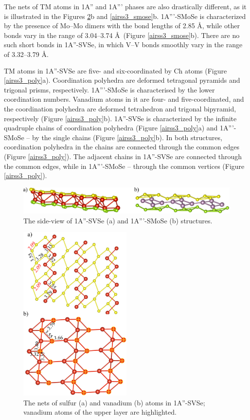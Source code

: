 \documentclass[a4paperm]{article}
\begin{document}
The nets of TM atoms in 1A'' and 1A''' phases are also drastically different, as it is illustrated in the Figures \ref{airss3_svse}b and \ref{airss3_smose}b.
1A'''-SMoSe is characterized by the presence of Mo--Mo dimers with the bond lengths of 2.85 \AA, while other bonds vary in the range of 3.04--3.74 \AA\ (Figure \ref{airss3_smose}b).
There are no such short bonds in 1A''-SVSe, in which V--V bonds smoothly vary in the range of 3.32--3.79 \AA.

TM atoms in 1A''-SVSe are five- and six-coordinated by Ch atoms (Figure \ref{airss3_poly}a).
Coordination polyhedra are deformed tetragonal pyramids and trigonal prisms, respectively.
1A'''-SMoSe is characterised by the lower coordination numbers.
Vanadium atoms in it are four- and five-coordinated, and the coordination polyhedra are deformed tetrahedron and trigonal bipyramid, respectively (Figure \ref{airss3_poly}b).
1A''-SVSe is characterized by the infinite quadruple chains of coordination polyhedra (Figure \ref{airss3_poly}a) and 1A'''-SMoSe -- by the single chains (Figure \ref{airss3_poly}b).
In both structures, coordination polyhedra in the chains are connected through the common edges (Figure \ref{airss3_poly}).
The adjacent chains in 1A''-SVSe are connected through the common edges, while in 1A'''-SMoSe -- through the common vertices (Figure \ref{airss3_poly}).

\begin{figure}[H]
	\includegraphics[width=\textwidth]{airss3_side.png}
	\caption{The side-view of 1A''-SVSe (a) and 1A'''-SMoSe (b) structures.}
	\label{airss3_side}
\end{figure}

\begin{figure}[H]
	\includegraphics[width=0.5\textwidth]{airss3_svse.png}
	\caption{The nets of sulfur (a) and vanadium (b) atoms in 1A''-SVSe; vanadium atoms of the upper layer are highlighted.}
	\label{airss3_svse}
\end{figure}
\end{document}
